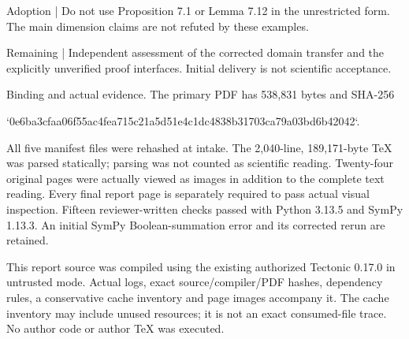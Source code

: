 \documentclass[10pt]{article}
\begin{document}
Adoption | Do not use Proposition 7.1 or Lemma 7.12 in the unrestricted form. The main dimension claims are not refuted by these examples.\par
Remaining | Independent assessment of the corrected domain transfer and the explicitly unverified proof interfaces. Initial delivery is not scientific acceptance.\par
Binding and actual evidence. The primary PDF has 538,831 bytes and SHA-256\par
`0e6ba3cfaa06f55ac4fea715c21a5d51e4c1dc4838b31703ca79a03bd6b42042`.\par
All five manifest files were rehashed at intake. The 2,040-line, 189,171-byte TeX was parsed statically; parsing was not counted as scientific reading. Twenty-four original pages were actually viewed as images in addition to the complete text reading. Every final report page is separately required to pass actual visual inspection. Fifteen reviewer-written checks passed with Python 3.13.5 and SymPy 1.13.3. An initial SymPy Boolean-summation error and its corrected rerun are retained.\par
This report source was compiled using the existing authorized Tectonic 0.17.0 in untrusted mode. Actual logs, exact source/compiler/PDF hashes, dependency rules, a conservative cache inventory and page images accompany it. The cache inventory may include unused resources; it is not an exact consumed-file trace. No author code or author TeX was executed.\par
\end{document}
